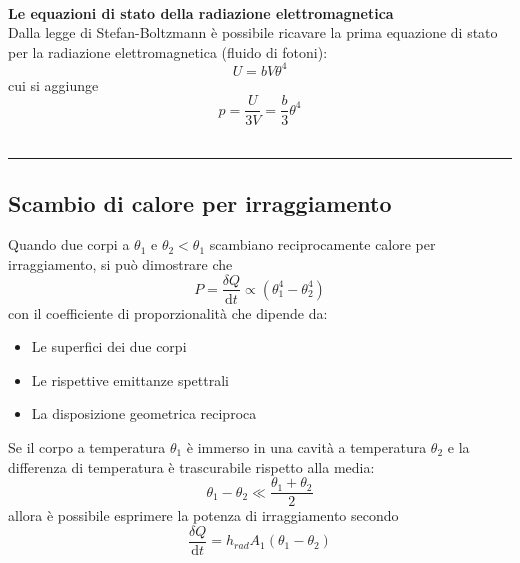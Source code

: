 \documentclass[10pt, oneside]{book}
\newcommand{\infobox}[2]{\vspace{0.5cm}~\\ \textbf{#1} \hrulefill \vspace{0.2cm}\\#2 {}\,\\\hrule \vspace{0.5cm}}
\begin{document}
\infobox{Le equazioni di stato della radiazione elettromagnetica}{Dalla legge di Stefan-Boltzmann è possibile ricavare la prima equazione di stato per la radiazione elettromagnetica (fluido di fotoni):
\[U = bV \theta^4\]
cui si aggiunge
\[p = \frac{U}{3V} = \frac{b}{3} \theta^4\]
}


\subsection{Scambio di calore per irraggiamento}
Quando due corpi a $\theta_1$ e $\theta_2 < \theta_1$ scambiano reciprocamente calore per irraggiamento, si può dimostrare che 
\[P = \frac{\delta Q}{\mathrm{d} t} \propto (\theta_1^4 - \theta_2^4)\]
con il coefficiente di proporzionalità che dipende da:
\begin{itemize}
\item Le superfici dei due corpi
\item Le rispettive emittanze spettrali
\item La disposizione geometrica reciproca
\end{itemize}
Se il corpo a temperatura $\theta_1$ è immerso in una cavità a temperatura $\theta_2$ e la differenza di temperatura è trascurabile rispetto alla media:
\[\theta_1 - \theta_2 \ll \frac{\theta_1 + \theta_2}{2}\]
allora è possibile esprimere la potenza di irraggiamento secondo
\[\frac{\delta Q}{\mathrm{d} t} = h_{rad} A_1 (\theta_1 - \theta_2)\]
\end{document}
